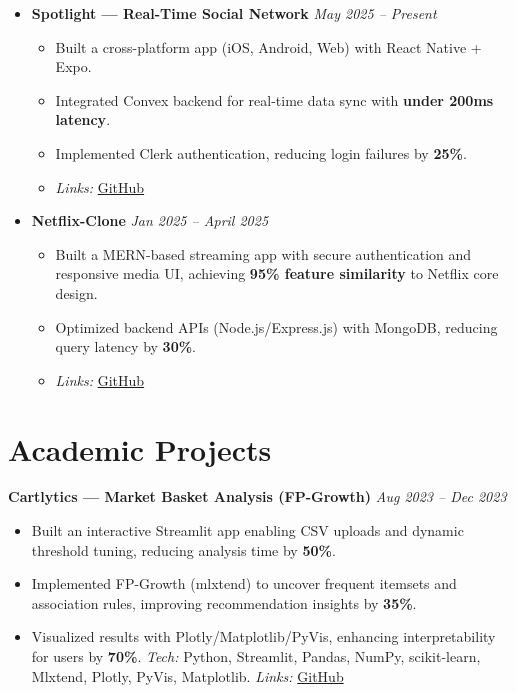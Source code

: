 \documentclass[10pt,a4paper]{article}
\begin{document}
	\begin{itemize}
		\item \textbf{Spotlight — Real-Time Social Network} \hfill \textit{May 2025 -- Present}
		\begin{itemize}
			\item Built a cross-platform app (iOS, Android, Web) with React Native + Expo.  
			\item Integrated Convex backend for real-time data sync with \textbf{under 200ms latency}.  
			\item Implemented Clerk authentication, reducing login failures by \textbf{25\%}.    
			\item \emph{Links:} \href{https://github.com/ValupadasuSaiabbhiram/SPOTLIGHT-APP}{GitHub}
		\end{itemize}
		
		\item \textbf{Netflix-Clone} \hfill \textit{Jan 2025 -- April 2025}
		\begin{itemize}
			\item Built a MERN-based streaming app with secure authentication and responsive media UI, achieving \textbf{95\% feature similarity} to Netflix core design.  
			\item Optimized backend APIs (Node.js/Express.js) with MongoDB, reducing query latency by \textbf{30\%}.  
			\item \emph{Links:} \href{https://github.com/ValupadasuSaiabbhiram/netflix-clone}{GitHub}
		\end{itemize}
			
	\end{itemize}
	

	\section*{Academic Projects}
	
	\textbf{Cartlytics — Market Basket Analysis (FP-Growth)} \hfill \textit{Aug 2023 -- Dec 2023}
	\begin{itemize}
		\item Built an interactive Streamlit app enabling CSV uploads and dynamic threshold tuning, reducing analysis time by \textbf{50\%}.  
		\item Implemented FP-Growth (mlxtend) to uncover frequent itemsets and association rules, improving recommendation insights by \textbf{35\%}.  
		\item Visualized results with Plotly/Matplotlib/PyVis, enhancing interpretability for users by \textbf{70\%}.  
		\emph{Tech:} Python, Streamlit, Pandas, NumPy, scikit-learn, Mlxtend, Plotly, PyVis, Matplotlib.  
		\emph{Links:} \href{https://github.com/ValupadasuSaiabbhiram/Cartlytics}{GitHub}
	\end{itemize}
	
\end{document}
